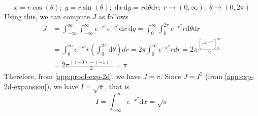 \documentclass[main.tex]{article}
\begin{document}
    \begin{equation}
        x = r \cos(\theta) ;\; y = r \sin(\theta) ;\; \mathrm{d}x \, \mathrm{d}y = r \mathrm{d}\theta \mathrm{d}r ;\; r \rightarrow (0, \infty) ;\; \theta \rightarrow (0, 2\pi)
    \end{equation}
    Using this, we can compute $J$ as follows
    \begin{equation}
        \begin{split}
            J & = \int_{-\infty}^{\infty} \int_{-\infty}^{\infty} e^{-x^2} e^{-y^2} \mathrm{d}x \, \mathrm{d}y
            = \int_{0}^{\infty} \int_{0}^{2\pi} e^{-r^2} r \mathrm{d}\theta \mathrm{d}r \\
            & = \int_{0}^{\infty} e^{-r^2} r \left ( \int_{0}^{2\pi} \mathrm{d}\theta \right ) dr
            = 2\pi \int_{0}^{\infty} e^{-r^2} r dr = 2\pi \frac{\left [ -e^{-r^2} \right ]_{0}^{\infty}}{2} \\
            & = 2\pi \frac{\left [ (-0) - (-1) \right ]}{2} = \pi
        \end{split}
        \label{app:proof-exp-2d}
    \end{equation}
    Therefore, from \ref{app:proof-exp-2d}, we have $J = \pi$. Since $J = I^2$ (from \ref{app:exp-2d-expansion}), we have $I = \sqrt{\pi}$, that is
    \begin{equation}
        \label{app:res-exp-mxsq}
        I = \int_{-\infty}^{\infty} e^{-x^2} \mathrm{d}x = \sqrt{\pi}
    \end{equation}
    
    \pagebreak
\end{document}
